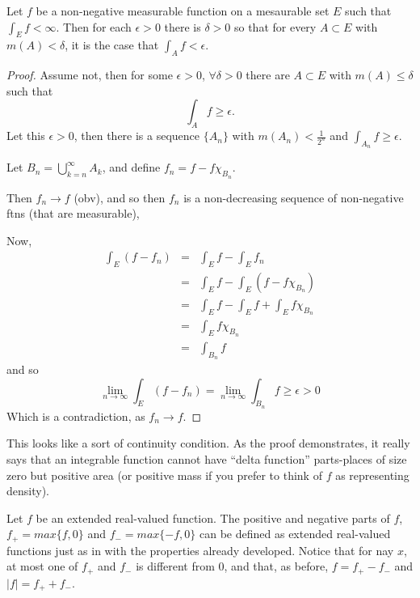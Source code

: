 \begin{pblm}%
	Let $f$ be a non-negative measurable function on a mesaurable set $E$ such that 
	$\int_E f < \infty$. Then for each $\epsilon > 0$ there is $\delta > 0$ so that 
	for every $A \subset E$ with $m(A) < \delta$, it is the case that $\int_Af<\epsilon$. 
\begin{proof}
	Assume not, then for some $\epsilon > 0$, $\forall \delta > 0$ there are 
	$A \subset E$ with $m(A) \le \delta$ such that 
	\begin{equation*}
		\int_A f \ge \epsilon.
	\end{equation*}
	Let this $\epsilon > 0$, then there is a sequence $\{A_n\}$ with 
	$m(A_n) < \frac{1}{2^n}$ and $\int_{A_n} f \ge \epsilon$. 

	Let $B_n =\bigcup\limits_{k=n}^\infty A_k$, and define $f_n = f - f\chi_{B_n}$. 

	Then $f_n \rightarrow f$ (obv), and so 
	then $f_n$ is a non-decreasing sequence of non-negative ftns (that are measurable), 

	Now, 
	\begin{equation*}
	\begin{array}{rcl}
		\int_E (f - f_n) & = & \int_E f - \int_E f_n \\
		& = & \int_E f - \int_E (f - f\chi_{B_n}) \\
		& = & \int_E f - \int_E f + \int_E f\chi_{B_n}\\
		& = & \int_E f\chi_{B_n} \\
		& = & \int_{B_n} f
	\end{array}
	\end{equation*}
	and so 
	\begin{equation*}
		\lim\limits_{n\to\infty} \int_E (f - f_n) = \lim\limits_{n\to\infty} \int_{B_n} f \ge \epsilon > 0
	\end{equation*}
	Which is a contradiction, as $f_n \rightarrow f$. 
\end{proof}
\end{pblm}

\begin{rmk}%
	This looks like a sort of continuity condition. As the proof demonstrates, it 
	really says that an integrable function cannot have ``delta function'' 
	parts-places of size zero but positive area (or positive mass if you prefer to 
	think of $f$ as representing density). 
\end{rmk}

\begin{rmk}%
	Let $f$ be an extended real-valued function. The positive and negative parts of 
	$f$, $f_+ = max\{f, 0\}$ and $f_- = max\{-f, 0\}$ can be defined as extended 
	real-valued functions just as in  with the properties already 
	developed. Notice that for nay $x$, at most one of $f_+$ and $f_-$ is different 
	from 0, and that, as before, $f = f_+ - f_-$ and $|f| = f_+ + f_-$. 
\end{rmk}

